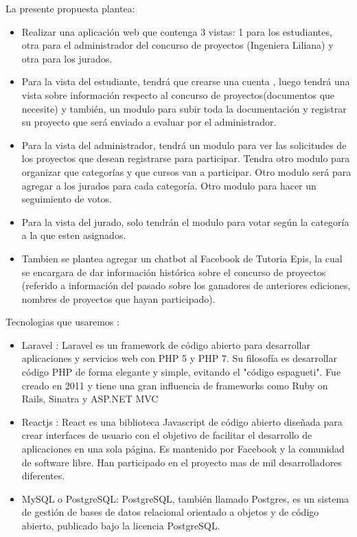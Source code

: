 \documentclass[%
 reprint,
 amsmath,amssymb,
 aps,
]{revtex4-1}
\begin{document}
La presente propuesta plantea:
\begin{itemize}
    \item Realizar una aplicación web que contenga 3 vistas: 1 para los estudiantes, otra para el administrador del concurso de proyectos (Ingeniera Liliana) y otra para los jurados.
     \item Para la vista del estudiante, tendrá que crearse una cuenta , luego tendrá una vista sobre información respecto al concurso de proyectos(documentos que necesite) y también, un modulo para subir toda la documentación y registrar su proyecto que será enviado a evaluar por el administrador.
     \item Para la vista del administrador, tendrá un modulo para ver las solicitudes de los proyectos que desean registrarse para participar. Tendra otro modulo para organizar que categorías y que cursos van a participar. Otro modulo será para agregar a los jurados para cada categoría. Otro modulo para hacer un seguimiento de votos. 
    \item Para la vista del jurado, solo tendrán el modulo para votar según la categoría a la que esten asignados.
    \item Tambien se plantea agregar un chatbot al Facebook de Tutoria Epis, la cual se encargara de dar información histórica sobre el concurso de proyectos (referido a información del pasado sobre los ganadores de anteriores ediciones, nombres de proyectos que hayan participado).
\end{itemize}
\newpage
Tecnologias que usaremos :
\begin{itemize}
\item Laravel :
Laravel es un framework de código abierto para desarrollar aplicaciones y servicios web con PHP 5 y PHP 7. Su filosofía es desarrollar código PHP de forma elegante y simple, evitando el "código espagueti". Fue creado en 2011 y tiene una gran influencia de frameworks como Ruby on Rails, Sinatra y ASP.NET MVC
\item Reactjs :
React es una biblioteca Javascript de código abierto diseñada para crear interfaces de usuario con el objetivo de facilitar el desarrollo de aplicaciones en una sola página. Es mantenido por Facebook y la comunidad de software libre. Han participado en el proyecto mas de mil desarrolladores diferentes.
\item MySQL o PostgreSQL:
PostgreSQL, también llamado Postgres, es un sistema de gestión de bases de datos relacional orientado a objetos y de código abierto, publicado bajo la licencia PostgreSQL.
\end{itemize}
\end{document}
